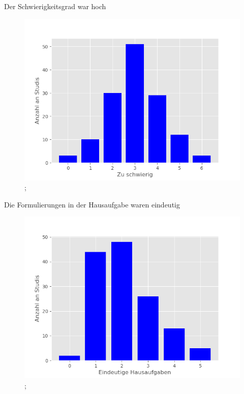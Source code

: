 \documentclass[10pt]{beamer}
\begin{document}
\begin{frame}[fragile]{Der Schwierigkeitsgrad war hoch} 
 \begin{figure}
 \includegraphics[width= 0.9\linewidth]{./PDFcreater/Plots/Der+Schwierigkeitsgrad+war+hoch.png};
 \end{figure}
 \end{frame}
\begin{frame}[fragile]{Die Formulierungen in der Hausaufgabe waren eindeutig} 
 \begin{figure}
 \includegraphics[width= 0.9\linewidth]{./PDFcreater/Plots/Die+Formulierungen+in+der+Hausaufgabe+waren+eindeutig.png};
 \end{figure}
 \end{frame}
\end{document}
